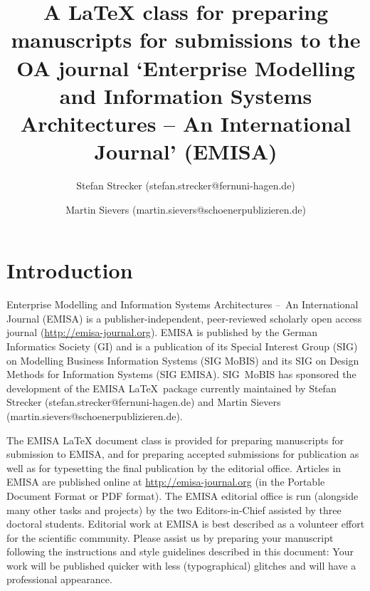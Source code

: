 \documentclass[a4paper]{ltxdoc}
\providecommand*\pkg[1]{\textsf{#1}}
\begin{document}
\author{Stefan Strecker (stefan.strecker@fernuni-hagen.de) \and Martin Sievers (martin.sievers@schoenerpublizieren.de)}
\title{A \LaTeX{} class for preparing manuscripts for submissions to the OA  journal ‘Enterprise Modelling and Information Systems Architectures – An International Journal’ (EMISA)}
\maketitle




\section{Introduction}
Enterprise Modelling and Information Systems Architectures --~An International Journal (EMISA) is a publisher-independent, peer-reviewed scholarly open access journal (\url{http://emisa-journal.org}). 
EMISA is published by the German Informatics Society (GI) and is a publication of its Special Interest Group (SIG) on Modelling Business Information Systems (SIG MoBIS) and its SIG on Design Methods for Information Systems (SIG EMISA). SIG~MoBIS has sponsored the development of the \pkg{EMISA} \LaTeX\ package currently maintained by Stefan Strecker (stefan.strecker@fernuni-hagen.de) and Martin Sievers (martin.sievers@schoenerpublizieren.de).

The EMISA \LaTeX{} document class is provided for preparing manuscripts for submission to EMISA, and for preparing accepted submissions for publication as well as for typesetting the final publication by the editorial office. Articles in EMISA are published online at \url{http://emisa-journal.org} (in the Portable Document Format or PDF format).
The EMISA editorial office is run (alongside many other tasks and projects) by the two Editors-in-Chief assisted by three doctoral students. Editorial work at EMISA is best described as a volunteer effort for the scientific community.
Please assist us by preparing your manuscript following the instructions and style guidelines described in this document: Your work will be published quicker with less (typographical) glitches and will have a professional appearance.
\end{document}

